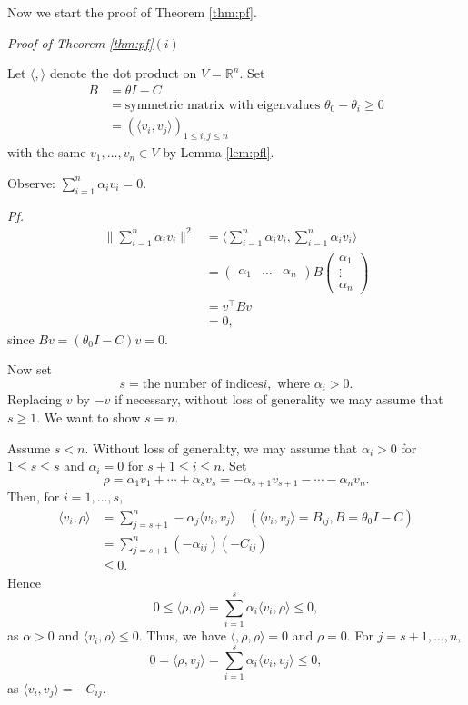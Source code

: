 \documentclass[
]{book}
\theoremstyle{definition}
\theoremstyle{definition}
\theoremstyle{definition}
\theoremstyle{definition}
\theoremstyle{remark}
\begin{document}
Now we start the proof of Theorem \ref{thm:pf}.

\emph{Proof of Theorem \ref{thm:pf}}\((i)\)

Let \(\langle , \rangle\) denote the dot product on \(V = \mathbb{R}^n\). Set
\begin{align}
B & = \theta I - C\\
  & = \textrm{symmetric matrix with eigenvalues }\theta_0 - \theta_i \geq 0\\
  & = (\langle v_i, v_j\rangle)_{1\leq i,j\leq n}
\end{align}
with the same \(v_1, \ldots, v_n \in V\) by Lemma \ref{lem:pfl}.

Observe: \(\sum_{i = 1}^n \alpha_iv_i = 0\).

\emph{Pf.}
\begin{align}
\|\sum_{i = 1}^n \alpha_iv_i\|^2 & = \langle \sum_{i=1}^n\alpha_iv_i, \sum_{i=1}^n\alpha_iv_i\rangle\\
& = \begin{pmatrix} \alpha_1 &\ldots &\alpha_n\end{pmatrix}B\begin{pmatrix} \alpha_1\\\vdots\\\alpha_n\end{pmatrix}\\
& = v^\top Bv\\
& = 0,
\end{align}
since \(Bv = (\theta_0 I - C)v = 0\).

Now set
\[s = \textrm{the number of indices} i, \textrm{ where } \alpha_i >0.\]
Replacing \(v\) by \(-v\) if necessary, without loss of generality we may assume that \(s\geq 1\). We want to show \(s = n\).

Assume \(s < n\). Without loss of generality, we may assume that \(\alpha_i >0\) for \(1\leq s\leq s\) and \(\alpha_i = 0\) for \(s+1 \leq i \leq n\).
Set
\[ \rho = \alpha_1v_1 + \cdots + \alpha_sv_s = -\alpha_{s+1}v_{s+1} - \cdots - \alpha_nv_n.\]
Then, for \(i = 1,\ldots, s\),
\begin{align}
\langle v_i, \rho \rangle & = \sum_{j = s+1}^n -\alpha_j\langle v_i, v_j\rangle \quad (\langle v_i, v_j\rangle = B_{ij}, B = \theta_0I - C)\\
  & = \sum_{j = s+1}^n (-\alpha_{ij})(-C_{ij})\\
  & \leq 0.
\end{align}
Hence
\[0\leq \langle \rho, \rho\rangle = \sum_{i=1}^s \alpha_i \langle v_i, \rho\rangle \leq 0,\]
as \(\alpha > 0\) and \(\langle v_i, \rho\rangle \leq 0\). Thus, we have
\(\langle, \rho, \rho \rangle = 0\) and \(\rho = 0\).
For \(j = s+1, \ldots, n\),
\[0 = \langle \rho, v_j\rangle = \sum_{i=1}^s \alpha_i\langle v_i, v_j\rangle \leq 0,\]
as \(\langle v_i, v_j\rangle = -C_{ij}\).
\end{document}
